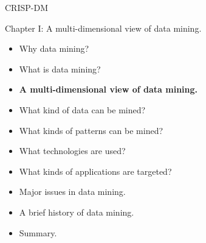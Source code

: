 \documentclass[aspectratio=169,t]{beamer}
\begin{document}
{\begin{frame}{CRISP-DM}
    \end{frame}
  }

  { 
    \begin{frame}{Chapter I: A multi-dimensional view of data mining.}
        \begin{itemize}
            \item Why data mining?
            \item What is data mining?
            \item \textbf{A multi-dimensional view of data mining.}
            \item What kind of data can be mined?
            \item What kinds of patterns can be mined?
            \item What technologies are used?
            \item What kinds of applications are targeted?
            \item Major issues in data mining.
            \item A brief history of data mining.
            \item Summary.
        \end{itemize}
    \end{frame}
  }
\end{document}
